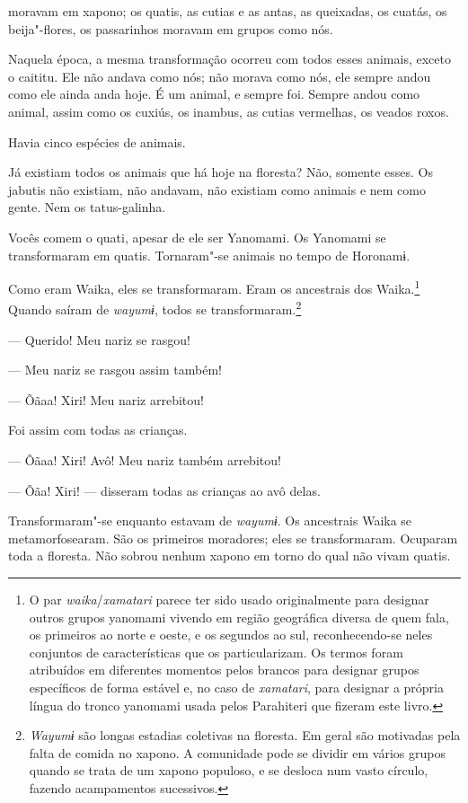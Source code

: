  

 moravam em xapono; os quatis, as cutias e as antas, as
queixadas, os cuatás, os beija"-flores, os passarinhos moravam em grupos
como nós.

Naquela época, a mesma transformação ocorreu com todos esses animais,
exceto o caititu. Ele não andava como nós; não morava como nós, ele
sempre andou como ele ainda anda hoje. É um animal, e sempre foi. Sempre
andou como animal, assim como os cuxiús, os inambus, as cutias
vermelhas, os veados roxos.

Havia cinco espécies de animais. 

Já existiam todos os animais que há hoje na floresta? Não, somente
esses. Os jabutis não existiam, não andavam, não existiam como animais e
nem como gente. Nem os tatus-galinha. 

Vocês comem o quati, apesar de ele ser Yanomami. Os Yanomami se
transformaram em quatis. Tornaram"-se animais no tempo de Horonamɨ. 

Como eram Waika, eles se transformaram. Eram os ancestrais dos Waika.\footnote{O par \emph{waika}/\emph{xamatari} parece ter sido usado originalmente para designar outros grupos yanomami vivendo em região geográfica diversa de quem fala, os primeiros ao norte e oeste, e os segundos ao sul, reconhecendo-se neles conjuntos de características que os particularizam. Os termos foram atribuídos em diferentes momentos pelos brancos para designar grupos específicos de forma estável e, no caso de \emph{xamatari}, para designar a própria língua do tronco yanomami usada pelos Parahiteri que fizeram este livro.} Quando saíram de \emph{wayumɨ}, todos se transformaram.\footnote{   \emph{Wayumɨ} são longas estadias coletivas na floresta. Em geral são motivadas pela falta de comida no xapono. A comunidade pode se dividir em vários grupos quando se trata de um xapono populoso, e se desloca num vasto círculo, fazendo acampamentos sucessivos.} 

--- Querido! Meu nariz se rasgou! 

--- Meu nariz se rasgou assim também!

--- Õãaa! Xiri! Meu nariz arrebitou! 

Foi assim com todas as crianças. 

--- Õãaa! Xiri! Avô! Meu nariz também arrebitou! 

--- Õãa! Xiri! --- disseram todas as crianças ao avô delas. 

Transformaram"-se enquanto estavam de \emph{wayumɨ}. Os ancestrais Waika
se metamorfosearam. São os primeiros moradores; eles se transformaram.
Ocuparam toda a floresta. Não sobrou nenhum xapono em torno do qual não
vivam quatis. 

